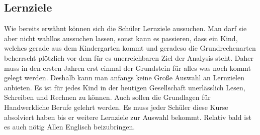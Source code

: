 \documentclass[12pt,a4paper]{article}
\begin{document}
\subsection{Lernziele}
Wie bereits erwähnt können sich die Schüler Lernziele aussuchen. Man darf sie aber nicht wahllos aussuchen lassen, sonst kann es passieren, dass ein Kind, welches gerade aus dem Kindergarten kommt und geradeso die Grundrechenarten beherrscht plötzlich vor dem für es unerreichbaren Ziel der Analysis steht. Daher muss in den ersten Jahren erst einmal der Grundstein für alles was noch kommt gelegt werden. Deshalb kann man anfangs keine Große Auswahl an Lernzielen anbieten. Es ist für jedes Kind in der heutigen Gesellschaft unerlässlich Lesen, Schreiben und Rechnen zu können. Auch sollen die Grundlagen für Handwerkliche Berufe gelehrt werden. Es muss jeder Schüler diese Kurse absolviert haben bis er weitere Lernziele zur Auswahl bekommt. Relativ bald ist es auch nötig Allen Englisch beizubringen.
\end{document}
